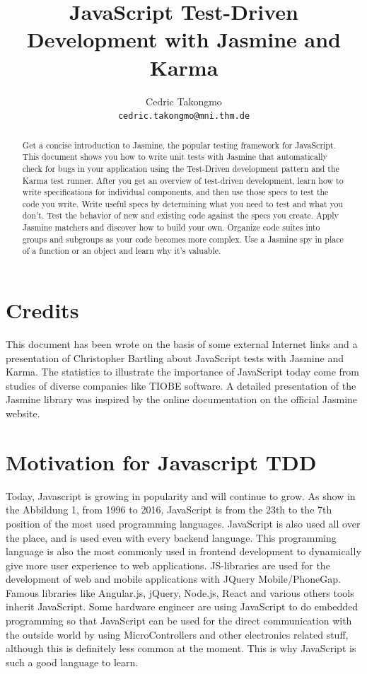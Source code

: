 \documentclass[11pt]{article}
\title{JavaScript Test-Driven Development with Jasmine and Karma}
\author{Cedric Takongmo \\
{\tt cedric.takongmo@mni.thm.de}}
\date{}
\begin{document}
\maketitle
\begin{abstract}
Get a concise introduction to Jasmine, the popular testing framework for JavaScript. This document shows you how to write unit tests with Jasmine that automatically check for bugs in your application using the Test-Driven development pattern and the Karma test runner. After you get an overview of test-driven development, learn how to write specifications for individual components, and then use those specs to test the code you write. Write useful specs by determining what you need to test and what you don’t. Test the behavior of new and existing code against the specs you create. Apply Jasmine matchers and discover how to build your own. Organize code suites into groups and subgroups as your code becomes more complex. Use a Jasmine spy in place of a function or an object and learn why it’s valuable.
\end{abstract}

\section{Credits}

This document has been wrote on the basis of some external Internet links and a presentation of Christopher Bartling about JavaScript tests with Jasmine and Karma. The statistics to illustrate the importance of JavaScript today come from studies of diverse companies like TIOBE software. A detailed presentation of the Jasmine library was inspired by the online documentation on the official Jasmine website. 

\section{Motivation for Javascript TDD}

Today, Javascript is growing in popularity and will continue to grow. As show in the Abbildung 1, from 1996 to 2016, JavaScript is from the 23th to the 7th position of the most used programming languages. JavaScript is also used all over the place, and is used even with every backend language. This programming language is also the most commonly used in frontend development to dynamically give more user experience to web applications. JS-libraries are used for the development of web and mobile applications with JQuery Mobile/PhoneGap. Famous libraries like Angular.js, jQuery, Node.js, React and various others tools inherit JavaScript. Some hardware engineer are using JavaScript to do embedded programming so that JavaScript can be used for the direct communication with the outside world by using MicroControllers and other electronics related stuff, although this is definitely less common at the moment. This is why JavaScript is such a good language to learn.
\end{document}
